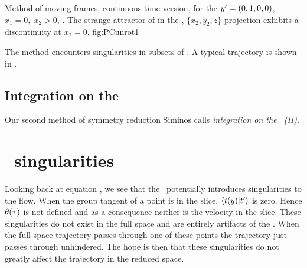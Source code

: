 {%
{}{
Method of moving frames, continuous time version, for the
${y'}=(0,1,0,0)$,
$x_1=0,\;x_2>0$, \slice. The strange attractor of
 in the \reducedsp,
$\{x_2,y_2,z\}$ projection exhibits a discontinuity at
$x_2=0$.
}
{fig:PCunrot1}

The method encounters singularities in
subsets of \statesp{}.
A typical trajectory is shown in .

\subsection{Integration on the \slice}

Our second method of symmetry reduction Siminos
 calls {\em integration on the
\slice\ (II)}.

\fi
	
	
\section{\Slice\ singularities}
\label{sect:sliceSing}

Looking back at equation , we see that the \mslices\ potentially introduces singularities to the flow. When the group tangent of a point is in the slice, $\left\langle {\ensuremath{t}(\ensuremath{y})}|{t'_{}} \right\rangle$ is zero. Hence  $\dot{{\bf \theta}(\tau)}$ is not defined and as a consequence neither is the velocity in the slice. These singularities do not exist in the full space and are entirely artifacts of the \mslices. When the full space trajectory passes through one of these points the trajectory just passes through unhindered. The hope is then that these singularities do not greatly affect the trajectory in the reduced space.

	\ifarticle
	\else
	
}
